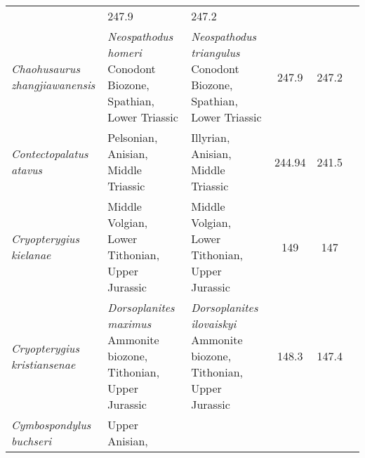 \begin{longtabu}{>{\itshape}lXXSSl}
                                                             & 247.9
                                                             & 247.2
                                                             &
                                                             \cite{Motani2014PO,Motani2015JVP} \\         
	Chaohusaurus zhangjiawanensis                        &
        \emph{Neospathodus homeri} Conodont Biozone, Spathian, Lower Triassic
                                                             &
        \emph{Neospathodus triangulus} Conodont Biozone, Spathian, Lower
        Triassic                                                          &
        247.9                    & 247.2                    & \cite{Chen2013AGS} \\                       
	Contectopalatus atavus                               & Pelsonian,
        Anisian, Middle Triassic
                                                             & Illyrian,
        Anisian, Middle Triassic
                                                             & 244.94
                                                             & 241.5
                                                             & \cite{Liu2013P} \\                        
	Cryopterygius kielanae                               & Middle Volgian,
        Lower Tithonian, Upper Jurassic
                                                             & Middle Volgian,
        Lower Tithonian, Upper Jurassic
                                                             & 149
                                                             & 147
                                                             &
                                                             \cite{Tyborowski2016APP} \\                 
	Cryopterygius kristiansenae                          &
        \emph{Dorsoplanites maximus} Ammonite biozone, Tithonian, Upper Jurassic
                                                             &
        \emph{Dorsoplanites ilovaiskyi} Ammonite biozone, Tithonian, Upper
        Jurassic                                                        & 148.3
                                                                        & 147.4
                                                                        &
                                                                        \cite{Druckenmiller2012NJG} \\             
	Cymbospondylus buchseri                              & Upper Anisian,

\end{longtabu}

